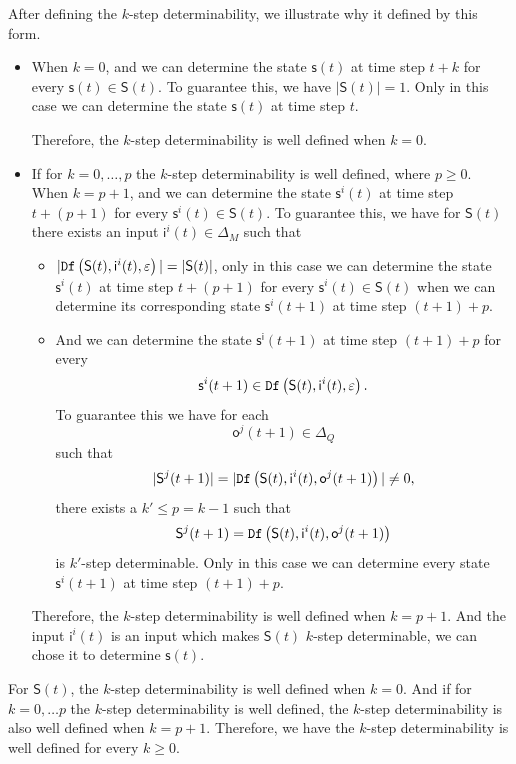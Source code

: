 After defining the $k$-step determinability, we illustrate why it defined by this form.
\begin{itemize}
\item When $k=0$, and we can determine the state $\mathsf{s}(t)$ at time step $t+k$ for every $\mathsf{s}(t)\in \mathsf{S}(t)$. To guarantee this, we have $|\mathsf{S}(t)|=1$. Only in this case we can determine the state $\mathsf{s}(t)$ at time step $t$. 

Therefore, the $k$-step determinability is well defined when $k=0$.

\item  If for $k=0,\ldots, p$ the $k$-step determinability is well defined, where $p\ge 0$. When $k=p+1$, and we can determine the state $\mathsf{s}^{i}(t)$ at time step $t+(p+1)$ for every $\mathsf{s}^{i}(t)\in \mathsf{S}(t)$. To guarantee this, we have for $\mathsf{S}(t)$ there exists an input $\mathsf{i}^{i}(t) \in \Delta_M$ such that
\begin{itemize}
\item $|{\tt Df}\left(\mathsf{S}(t),\mathsf{i}^{i}(t),\varepsilon\right)|=|\mathsf{S}(t)|$, only in this case we can determine the state $\mathsf{s}^{i}(t)$ at time step $t+(p+1)$ for every $\mathsf{s}^{i}(t)\in \mathsf{S}(t)$ when we can determine its corresponding state $\mathsf{s}^{i}(t+1)$ at time step $(t+1)+p$.
\item And we can determine the state $\mathsf{s^{i}}(t+1)$ at time step $(t+1)+p$ for every \[\mathsf{s}^{i}(t+1)\in {\tt Df}\left(\mathsf{S}(t),\mathsf{i}^{i}(t),\varepsilon\right).\] To guarantee this we have for each \[\mathsf{o}^{j}(t+1)\in \Delta_Q\] such that \[|\mathsf{S}^{j}(t+1)|=|{\tt Df}\left(\mathsf{S}(t),\mathsf{i}^{i}(t),\mathsf{o}^{j}(t+1)\right)|\neq 0,\] there exists a ${k'}\le p=k-1$ such that \[\mathsf{S}^{j}(t+1)={\tt Df}\left(\mathsf{S}(t),\mathsf{i}^{i}(t),\mathsf{o}^{j}(t+1)\right)\] is $k'$-step determinable. Only in this case we can determine every state $\mathsf{s}^{i}(t+1)$ at time step $(t+1)+p$.
 \end{itemize}
Therefore, the $k$-step determinability is well defined when $k=p+1$. And the input $\mathsf{i}^{i}(t)$ is an input which makes $\mathsf{S}(t)$ $k$-step determinable, we can chose it to determine $\mathsf{s}(t)$.

 \end{itemize}
 
For $\mathsf{S}(t)$, the $k$-step determinability is well defined when $k=0$. And if for $k=0,\ldots p$ the $k$-step determinability is well defined, the $k$-step determinability is also well defined when $k=p+1$. Therefore, we have the $k$-step determinability is well defined for every $k\ge 0$. 

